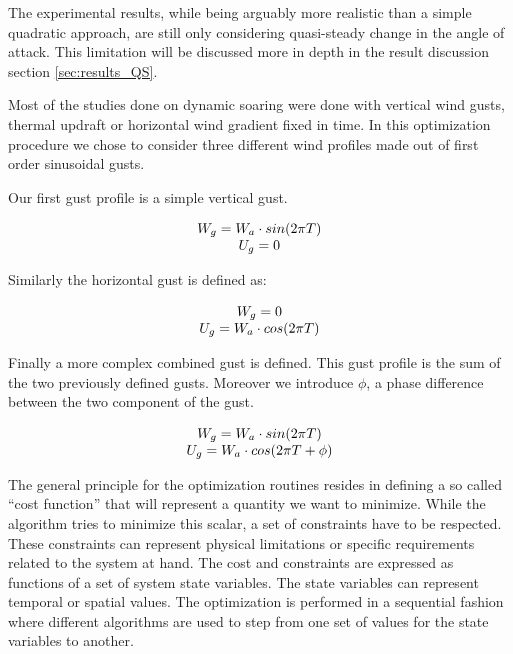 \par The experimental results, while being arguably more realistic than a simple quadratic approach, are still only considering quasi-steady change in the angle of attack.
This limitation will be discussed more in depth in the result discussion section \ref{sec:results_QS}.

\FloatBarrier
{}
Most of the studies done on dynamic soaring were done with vertical wind gusts, thermal updraft or horizontal wind gradient fixed in time.
In this optimization procedure we chose to consider three different wind profiles made out of first order sinusoidal gusts.

\par Our first gust profile is a simple vertical gust.

\begin{equation}
\begin{array}[c]{c}
  W_g = W_a \cdot sin(2\pi T) \\
  U_g = 0 
\end{array}
\label{eqn:vertical_gust_definition}
\end{equation}

\par Similarly the horizontal gust is defined as:

\begin{equation}
\begin{array}[c]{c}
  W_g = 0 \\
  U_g = W_a \cdot cos(2 \pi T)
\end{array}
\label{eqn:horizontal_gust_definition}
\end{equation}

\par Finally a more complex combined gust is defined.
This gust profile is the sum of the two previously defined gusts.
Moreover we introduce $\phi$, a phase difference between the two component of the gust. 

\begin{equation}
\begin{array}[c]{c}
  W_g = W_a \cdot sin(2\pi T) \\
  U_g = W_a \cdot cos(2 \pi T + \phi)
\end{array}
\label{eqn:combined_gust_definition}
\end{equation}


The general principle for the optimization routines resides in defining a so called ``cost function'' that will represent a quantity we want to minimize.
While the algorithm tries to minimize this scalar, a set of constraints have to be respected. 
These constraints can represent physical limitations or specific requirements related to the system at hand.
The cost and constraints are expressed as functions of a set of system state variables.
The state variables can represent temporal or spatial values.
The optimization is performed in a sequential fashion where different algorithms are used to step from one set of values for the state variables to another. 


